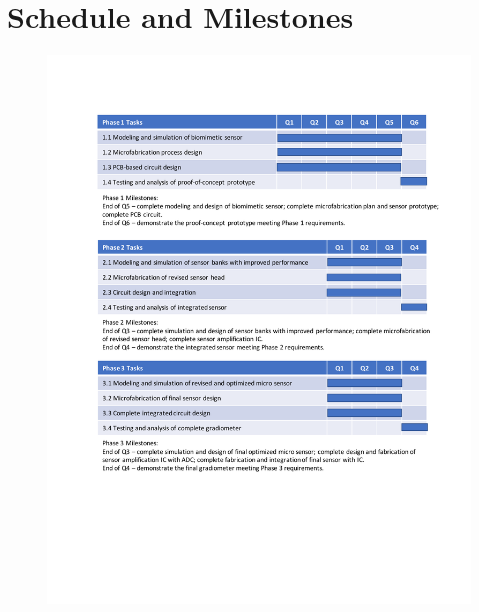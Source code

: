 \section{Schedule and Milestones}

\begin{figure}
\centering
\includegraphics[width=\textwidth]{Gantt_chart_milestone}
\label{fig:gantt}
\end{figure}



